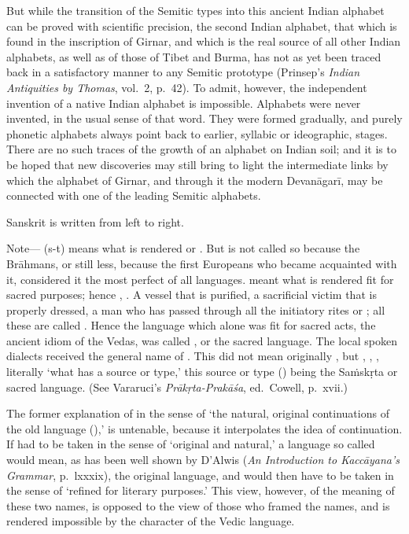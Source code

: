 \begin{note}
  But while the transition of the Semitic types into this ancient Indian
  alphabet can be proved with scientific precision, the second Indian
  alphabet, that which is found in the inscription of Girnar, and which
  is the real source of all other Indian alphabets, as well as of those
  of Tibet and Burma, has not as yet been traced back in a satisfactory
  manner to any Semitic prototype (Prinsep's \emph{Indian Antiquities by
    Thomas}, vol.\ 2, p.\ 42). To admit, however, the independent
  invention of a native Indian alphabet is impossible. Alphabets were
  never invented, in the usual sense of that word. They were formed
  gradually, and purely phonetic alphabets always point back to earlier,
  syllabic or ideographic, stages. There are no such traces of the
  growth of an alphabet on Indian soil; and it is to be hoped that new
  discoveries may still bring to light the intermediate links by which
  the alphabet of Girnar, and through it the modern Devanāgarī, may be
  connected with one of the leading Semitic alphabets.
\end{note}

\s Sanskrit is written from left to right.

\begin{note}
  Note— ({\dn s\2-t}) means what is rendered  or
  . But  is not called so because the
  Brāhmans, or still less, because the first Europeans who became
  acquainted with it, considered it the most perfect of all languages.
   meant what is rendered fit for sacred purposes; hence
  , . A vessel that is purified, a sacrificial
  victim that is properly dressed, a man who has passed through all the
  initiatory rites or ; all these are called
  . Hence the language which alone was fit for sacred acts,
  the ancient idiom of the Vedas, was called , or the
  sacred language. The local spoken dialects received the general name
  of . This did not mean originally , but
  , , , literally `what has
  a source or type,' this source or type () being the
  Saṁskṛta or sacred language. (See Vararuci's \emph{Prākṛta-Prakāśa},
  ed.\ Cowell, p.\ xvii.)

  The former explanation of  in the sense of `the natural,
  original continuations of the old language (),' is
  untenable, because it interpolates the idea of continuation. If
   had to be taken in the sense of `original and natural,' a
  language so called would mean, as has been well shown by D'Alwis
  (\emph{An Introduction to Kaccāyana's Grammar}, p.\ lxxxix), the
  original language, and  would then have to be taken in
  the sense of `refined for literary purposes.' This view, however, of
  the meaning of these two names, is opposed to the view of those who
  framed the names, and is rendered impossible by the character of the
  Vedic language.
\end{note}

